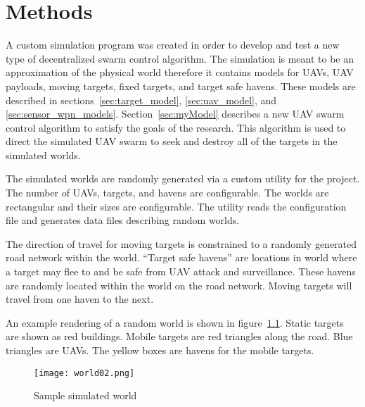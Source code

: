 \chapter{Methods}
\label{chap:worldScenModel}

A custom simulation program was created in order to develop and test a new type of decentralized swarm control algorithm. The simulation is meant to be an approximation of the physical world therefore it contains models for UAVs, UAV payloads, moving targets, fixed targets, and target safe havens.  These models are described in sections~\ref{sec:target_model}, \ref{sec:uav_model}, and \ref{sec:sensor_wpn_models}.  Section~\ref{sec:myModel} describes a new UAV swarm control algorithm to satisfy the goals of the research.  This algorithm is used to direct the simulated UAV swarm to seek and destroy all of the targets in the simulated worlds.

The simulated worlds are randomly generated via a custom utility for the project.  The number of UAVs, targets, and havens are configurable.  The worlds are rectangular and their sizes are configurable.  The utility reads the configuration file and generates data files describing random worlds.  


The direction of travel for moving targets is constrained to a randomly generated road network within the world.  ``Target safe havens'' are locations in world where a target may flee to and be safe from UAV attack and surveillance.  These havens are randomly located within the world on the road network.  Moving targets will travel from one haven to the next.

An example rendering of a random world is shown in figure~\ref{fig:sample_world}. Static targets are shown as red buildings.  Mobile targets are red triangles along the road.  Blue triangles are UAVs.  The yellow boxes are havens for the mobile targets.




\begin{figure}[H]
	\centering
	\texttt{[image: world02.png]}
	\caption{Sample simulated world}
	\label{fig:sample_world}
\end{figure}



